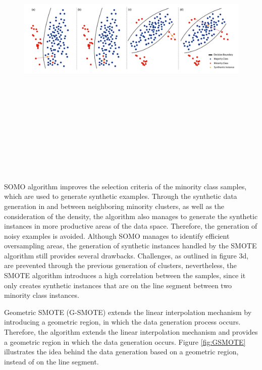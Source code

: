 \documentclass[parskip=full]{scrartcl}
\begin{document}
\begin{figure}[H]
	\centering
	\includegraphics[width=16.5cm, height=14cm, keepaspectratio]{../analysis/fig3.png}
\end{figure}

SOMO algorithm improves the selection criteria of the minority class samples, which are used to generate synthetic examples. Through the synthetic data generation in and between neighboring minority clusters, as well as the consideration of the density, the algorithm also manages to generate the synthetic instances in more productive areas of the data space. Therefore, the generation of noisy examples is avoided. Although SOMO manages to identify efficient oversampling areas, the generation of synthetic instances handled by the SMOTE algorithm still provides several drawbacks. Challenges, as outlined in figure 3d, are prevented through the previous generation of clusters, nevertheless, the SMOTE algorithm introduces a high correlation between the samples, since it only creates synthetic instances that are on the line segment between two minority class instances.

Geometric SMOTE (G-SMOTE) extends the linear interpolation mechanism by
introducing a geometric region, in which the data generation process occurs. Therefore, the algorithm extends the linear interpolation mechanism and provides a geometric region in which the data generation occurs. Figure \ref{fig:GSMOTE} illustrates the idea behind the data generation based on a geometric region, instead of on the line segment.
\end{document}
